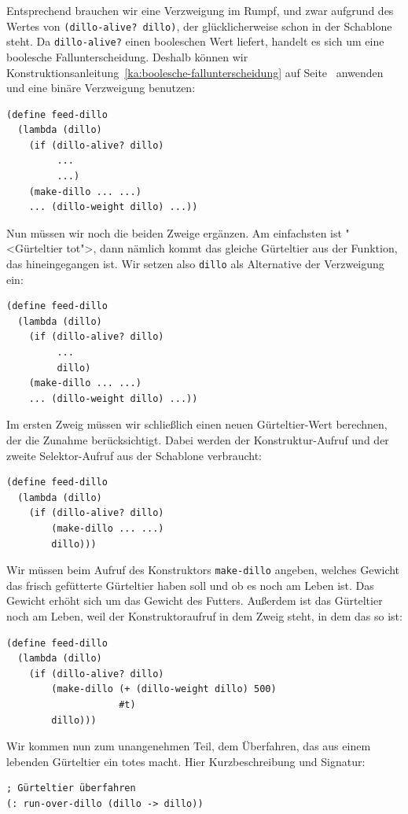 Entsprechend brauchen wir eine Verzweigung im Rumpf, und zwar aufgrund
des Wertes von \lstinline{(dillo-alive? dillo)}, der glücklicherweise schon in der
Schablone steht.  Da \lstinline{dillo-alive?} einen booleschen Wert
liefert, handelt es sich um eine boolesche Fallunterscheidung.
Deshalb 
können wir Konstruktionsanleitung~\ref{ka:boolesche-fallunterscheidung}
auf Seite~\pageref{ka:boolesche-fallunterscheidung} anwenden und eine
binäre Verzweigung benutzen:
%
\begin{lstlisting}
(define feed-dillo
  (lambda (dillo)
    (if (dillo-alive? dillo)
         ...
         ...)
    (make-dillo ... ...)
    ... (dillo-weight dillo) ...))
\end{lstlisting}
%
Nun müssen wir noch die beiden Zweige ergänzen.  Am
einfachsten ist "<Gürteltier tot">, dann nämlich kommt
das gleiche Gürteltier aus der Funktion, das hineingegangen ist.  Wir
setzen also \lstinline{dillo} als Alternative der Verzweigung ein:
%
\begin{lstlisting}
(define feed-dillo
  (lambda (dillo)
    (if (dillo-alive? dillo)
         ...
         dillo)
    (make-dillo ... ...)
    ... (dillo-weight dillo) ...))
\end{lstlisting}
%
Im ersten Zweig müssen wir schließlich einen neuen Gürteltier-Wert
berechnen, der die Zunahme berücksichtigt.  Dabei werden der
Konstruktur-Aufruf und der zweite Selektor-Aufruf aus der Schablone
verbraucht:
\begin{lstlisting}
(define feed-dillo
  (lambda (dillo)
    (if (dillo-alive? dillo)
        (make-dillo ... ...)
        dillo)))
\end{lstlisting}
%
Wir müssen beim Aufruf des Konstruktors \lstinline{make-dillo} angeben,
welches Gewicht das frisch gefütterte Gürteltier haben soll und ob es
noch am Leben ist.  Das Gewicht erhöht sich um das Gewicht des
Futters.  Außerdem ist das Gürteltier noch am Leben, weil der
Konstruktoraufruf in dem Zweig steht, in dem das so ist:
%
\begin{lstlisting}
(define feed-dillo
  (lambda (dillo)
    (if (dillo-alive? dillo)
        (make-dillo (+ (dillo-weight dillo) 500)
                    #t)
        dillo)))
\end{lstlisting}
%
Wir kommen nun zum unangenehmen Teil, dem Überfahren, das aus einem
lebenden Gürteltier ein totes macht.  Hier Kurzbeschreibung und
Signatur:\label{page:run-over-dillo}
%
\begin{lstlisting}
; Gürteltier überfahren
(: run-over-dillo (dillo -> dillo))
\end{lstlisting}
